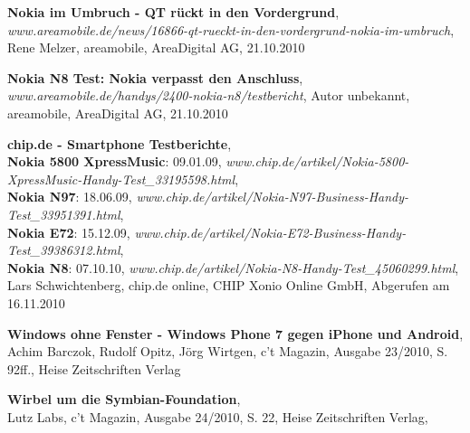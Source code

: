\begin{thebibliography}{---}
	
	\textbf{Nokia im Umbruch - QT rückt in den Vordergrund}, \\
	\emph{www.areamobile.de/news/16866-qt-rueckt-in-den-vordergrund-nokia-im-umbruch},
	Rene Melzer, areamobile, AreaDigital AG, 21.10.2010
	
	\textbf{Nokia N8 Test: Nokia verpasst den Anschluss}, \\
	\emph{www.areamobile.de/handys/2400-nokia-n8/testbericht},
	Autor unbekannt, areamobile, AreaDigital AG, 21.10.2010
		
	\textbf{chip.de - Smartphone Testberichte},\\
	\textbf{Nokia 5800 XpressMusic}: 09.01.09, \emph{www.chip.de/artikel/Nokia-5800-XpressMusic-Handy-Test\_33195598.html},\\
	\textbf{Nokia N97}: 18.06.09, \emph{www.chip.de/artikel/Nokia-N97-Business-Handy-Test\_33951391.html},\\
	\textbf{Nokia E72}: 15.12.09, \emph{www.chip.de/artikel/Nokia-E72-Business-Handy-Test\_39386312.html},\\
	\textbf{Nokia N8}: 07.10.10, \emph{www.chip.de/artikel/Nokia-N8-Handy-Test\_45060299.html},\\
	Lars Schwichtenberg, chip.de online, CHIP Xonio Online GmbH, Abgerufen am 16.11.2010 
	
	\textbf{Windows ohne Fenster - Windows Phone 7 gegen iPhone und Android},\\
	Achim Barczok, Rudolf Opitz, Jörg Wirtgen, c't Magazin, Ausgabe 23/2010, S. 92ff., Heise Zeitschriften Verlag

	\textbf{Wirbel um die Symbian-Foundation},\\
	Lutz Labs, c't Magazin, Ausgabe 24/2010, S. 22, Heise Zeitschriften Verlag,
	
\end{thebibliography}

